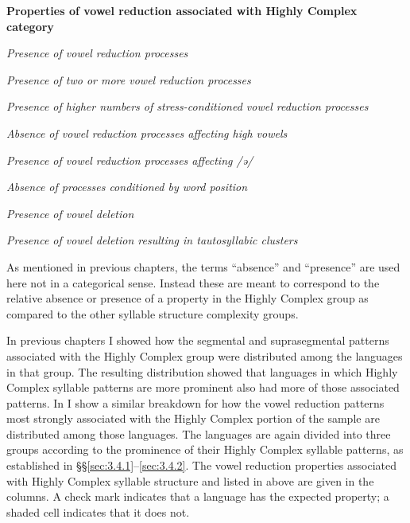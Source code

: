 \ea\label{ex:6.20}
  \textbf{Properties of vowel reduction associated with Highly Complex category}

\textit{Presence of vowel reduction processes}

\textit{Presence of two or more vowel reduction processes}

\textit{Presence of higher numbers of stress-conditioned vowel reduction processes}

\textit{Absence of vowel reduction processes affecting high vowels}

\textit{Presence of vowel reduction processes affecting /ə/}

\textit{Absence of processes conditioned by word position}

\textit{Presence of vowel deletion}

\textit{Presence of vowel deletion resulting in tautosyllabic clusters}
\z

  As mentioned in previous chapters, the terms ``absence'' and ``presence'' are used here not in a categorical sense. Instead these are meant to correspond to the relative absence or presence of a property in the Highly Complex group as compared to the other syllable structure complexity groups.

  In previous chapters I showed how the segmental and suprasegmental patterns associated with the Highly Complex group were distributed among the languages in that group. The resulting distribution showed that languages in which Highly Complex syllable patterns are more prominent also had more of those associated patterns. In  I show a similar breakdown for how the vowel reduction patterns most strongly associated with the Highly Complex portion of the sample are distributed among those languages. The languages are again divided into three groups according to the prominence of their Highly Complex syllable patterns, as established in §§\ref{sec:3.4.1}--\ref{sec:3.4.2}. The vowel reduction properties associated with Highly Complex syllable structure and listed in  above are given in the columns. A check mark indicates that a language has the expected property; a shaded cell indicates that it does not. 

